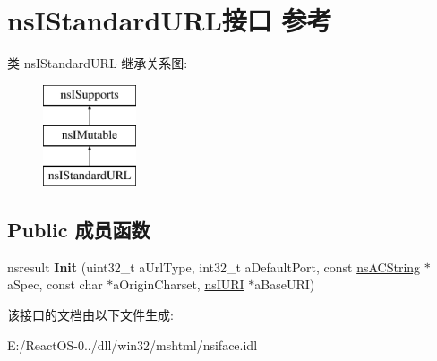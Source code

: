 \hypertarget{interfacens_i_standard_u_r_l}{}\section{ns\+I\+Standard\+U\+R\+L接口 参考}
\label{interfacens_i_standard_u_r_l}
类 ns\+I\+Standard\+U\+RL 继承关系图\+:\begin{figure}[H]
\begin{center}
\leavevmode
\includegraphics[height=3.000000cm]{interfacens_i_standard_u_r_l}
\end{center}
\end{figure}
\subsection*{Public 成员函数}
\begin{DoxyCompactItemize}
\item 
\mbox{\label{interfacens_i_standard_u_r_l_a5172e1168bdf0fc420e10ece913ec6dd}} 
nsresult {\bfseries Init} (uint32\+\_\+t a\+Url\+Type, int32\+\_\+t a\+Default\+Port, const \hyperlink{structns_c_string_container}{ns\+A\+C\+String} $\ast$a\+Spec, const char $\ast$a\+Origin\+Charset, \hyperlink{interfacens_i_u_r_i}{ns\+I\+U\+RI} $\ast$a\+Base\+U\+RI)
\end{DoxyCompactItemize}


该接口的文档由以下文件生成\+:\begin{DoxyCompactItemize}
\item 
E\+:/\+React\+O\+S-\/0../dll/win32/mshtml/nsiface.\+idl\end{DoxyCompactItemize}
